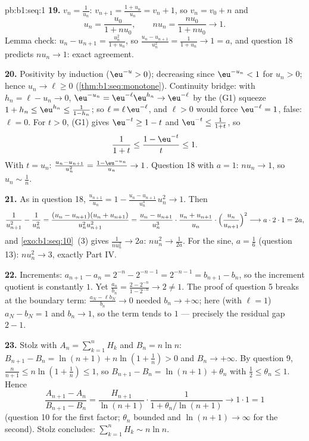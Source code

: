 \begin{solution}{pb:b1:seq:1}
\textbf{19.} $v_n = \frac{1}{u_n}$: $v_{n+1} = \frac{1 +
u_n}{u_n} = v_n + 1$, so $v_n = v_0 + n$ and
\[
u_n = \frac{u_0}{1 + n u_0} , \qquad
n u_n = \frac{n u_0}{1 + n u_0} \longrightarrow 1 .
\]
Lemma check: $u_n - u_{n+1} = \frac{u_n^2}{1 + u_n}$, so
$\frac{u_n - u_{n+1}}{u_n^2} = \frac{1}{1 + u_n} \to 1 = a$, and
question 18 predicts $n u_n \to 1$: exact agreement.

\textbf{20.} Positivity by induction ($\eu^{-u} > 0$);
decreasing since $\eu^{-u_n} < 1$ for $u_n > 0$; hence $u_n \to
\ell \geq 0$ (\cref{thm:b1:seq:monotone}). Continuity bridge:
with $h_n = \ell - u_n \to 0$, $\eu^{-u_n} = \eu^{-\ell}
\eu^{h_n} \to \eu^{-\ell}$ by the (G1) squeeze $1 + h_n \leq
\eu^{h_n} \leq \frac{1}{1 - h_n}$; so $\ell = \ell\,
\eu^{-\ell}$, and $\ell > 0$ would force $\eu^{-\ell} = 1$,
false: $\ell = 0$. For $t > 0$, (G1) gives $\eu^{-t} \geq 1 - t$
and $\eu^{-t} \leq \frac{1}{1 + t}$, so
\[
\frac{1}{1 + t} \leq \frac{1 - \eu^{-t}}{t} \leq 1 .
\]
With $t = u_n$: $\frac{u_n - u_{n+1}}{u_n^2} = \frac{1 -
\eu^{-u_n}}{u_n} \to 1$. Question 18 with $a = 1$: $n u_n \to
1$, so $u_n \sim \frac1n$.

\textbf{21.} As in question 18, $\frac{u_{n+1}}{u_n} = 1 -
\frac{u_n - u_{n+1}}{u_n^3}\,u_n^2 \to 1$. Then
\[
\frac{1}{u_{n+1}^2} - \frac{1}{u_n^2}
= \frac{(u_n - u_{n+1})(u_n + u_{n+1})}{u_n^2 u_{n+1}^2}
= \frac{u_n - u_{n+1}}{u_n^3}\cdot
\frac{u_n + u_{n+1}}{u_n}\cdot
\Bigl(\frac{u_n}{u_{n+1}}\Bigr)^2
\longrightarrow a \cdot 2 \cdot 1 = 2a ,
\]
and \cref{exo:b1:seq:10}~(3) gives $\frac{1}{n u_n^2} \to 2a$:
$n u_n^2 \to \frac{1}{2a}$. For the sine, $a = \frac16$
(question 13): $n u_n^2 \to 3$, exactly Part IV.

\textbf{22.} Increments: $a_{n+1} - a_n = 2^{-n} - 2^{-n-1} =
2^{-n-1} = b_{n+1} - b_n$, so the increment quotient is
constantly $1$. Yet $\frac{a_n}{b_n} = \frac{2 - 2^{-n}}{1 -
2^{-n}} \to 2 \neq 1$. The proof of question 5 breaks at the
boundary term: $\frac{a_N - \ell b_N}{b_n} \to 0$ needed $b_n
\to +\infty$; here (with $\ell = 1$) $a_N - b_N = 1$ and $b_n
\to 1$, so the term tends to $1$ --- precisely the residual gap
$2 - 1$.

\textbf{23.} Stolz with $A_n = \sum_{k=1}^n H_k$ and $B_n = n\ln
n$: $B_{n+1} - B_n = \ln(n+1) + n\ln(1 + \frac1n) > 0$ and $B_n
\to +\infty$. By question 9, $\frac{n}{n+1} \leq n\ln(1 +
\frac1n) \leq 1$, so $B_{n+1} - B_n = \ln(n+1) + \theta_n$ with
$\frac12 \leq \theta_n \leq 1$. Hence
\[
\frac{A_{n+1} - A_n}{B_{n+1} - B_n}
= \frac{H_{n+1}}{\ln(n+1)}\cdot
\frac{1}{1 + \theta_n/\ln(n+1)} \longrightarrow 1 \cdot 1 = 1
\]
(question 10 for the first factor; $\theta_n$ bounded and
$\ln(n+1) \to \infty$ for the second). Stolz concludes:
$\sum_{k=1}^n H_k \sim n\ln n$.


\end{solution}
